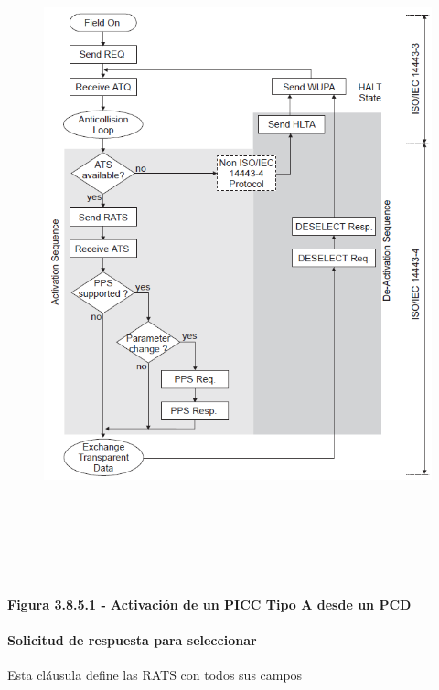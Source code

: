 \begin{figure}[H]
	\begin{center}
		\includegraphics[width=6.27in,height=7.64in]{Norma_ISO/14443-4/media/image8.png}
    \end{center}
\end{figure}



\par
\begin{center}
\textbf{Figura 3.8.5.1 - Activación de un PICC Tipo A desde un PCD}
\end{center}
\par

\paragraph{Solicitud de respuesta para seleccionar}
Esta cláusula define las RATS con todos sus campos\par

